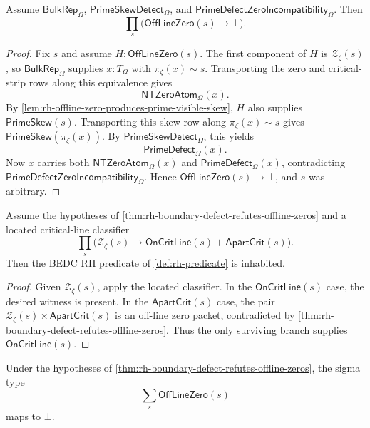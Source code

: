 \begin{theorem}
\label{thm:rh-boundary-defect-refutes-offline-zeros}
Assume $\mathsf{BulkRep}_{\Omega}$,
$\mathsf{PrimeSkewDetect}_{\Omega}$, and
$\mathsf{PrimeDefectZeroIncompatibility}_{\Omega}$. Then
$$
\prod_s
\bigl(
\mathsf{OffLineZero}(s)\to\bot
\bigr).
$$
\end{theorem}

\begin{proof}
Fix $s$ and assume $H:\mathsf{OffLineZero}(s)$. The first component of $H$
is $\mathcal Z_{\zeta}(s)$, so $\mathsf{BulkRep}_{\Omega}$ supplies
$x:T_{\Omega}$ with $\pi_{\zeta}(x)\sim s$. Transporting the zero and
critical-strip rows along this equivalence gives
$$
\mathsf{NTZeroAtom}_{\Omega}(x).
$$
By \autoref{lem:rh-offline-zero-produces-prime-visible-skew}, $H$ also
supplies $\mathsf{PrimeSkew}(s)$. Transporting this skew row along
$\pi_{\zeta}(x)\sim s$ gives $\mathsf{PrimeSkew}(\pi_{\zeta}(x))$. By
$\mathsf{PrimeSkewDetect}_{\Omega}$, this yields
$$
\mathsf{PrimeDefect}_{\Omega}(x).
$$
Now $x$ carries both $\mathsf{NTZeroAtom}_{\Omega}(x)$ and
$\mathsf{PrimeDefect}_{\Omega}(x)$, contradicting
$\mathsf{PrimeDefectZeroIncompatibility}_{\Omega}$. Hence
$\mathsf{OffLineZero}(s)\to\bot$, and $s$ was arbitrary.
\end{proof}

\begin{corollary}
\label{cor:rh-located-zero-defect-refutation-gives-rh}
Assume the hypotheses of
\autoref{thm:rh-boundary-defect-refutes-offline-zeros} and a located
critical-line classifier
$$
\prod_s
\bigl(
\mathcal Z_{\zeta}(s)
\to
\mathsf{OnCritLine}(s)+\mathsf{ApartCrit}(s)
\bigr).
$$
Then the BEDC RH predicate of \autoref{def:rh-predicate} is inhabited.
\end{corollary}

\begin{proof}
Given $\mathcal Z_{\zeta}(s)$, apply the located classifier. In the
$\mathsf{OnCritLine}(s)$ case, the desired witness is present. In the
$\mathsf{ApartCrit}(s)$ case, the pair
$\mathcal Z_{\zeta}(s)\times\mathsf{ApartCrit}(s)$ is an off-line zero
packet, contradicted by
\autoref{thm:rh-boundary-defect-refutes-offline-zeros}. Thus the only
surviving branch supplies $\mathsf{OnCritLine}(s)$.
\end{proof}

\begin{corollary}
\label{cor:rh-offline-zero-type-empty}
Under the hypotheses of
\autoref{thm:rh-boundary-defect-refutes-offline-zeros}, the sigma type
$$
\sum_s \mathsf{OffLineZero}(s)
$$
maps to $\bot$.
\end{corollary}

